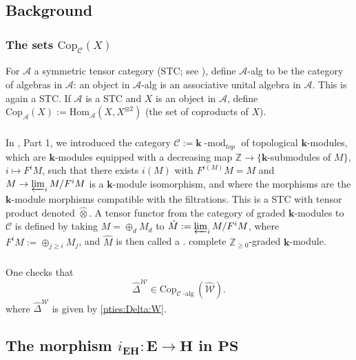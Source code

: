 \documentclass[10pt]{amsart}
\numberwithin{equation}{subsection}
\begin{document}
\subsection{Background}\label{213:toto:BIS:5786}

\subsubsection{The sets $\mathrm{Cop}_{\mathcal C}(X)$}

For $\mathcal A$ a symmetric tensor category (STC; see \cite{McL}), define $\mathcal A$-alg to be the 
category of algebras in $\mathcal A$: an object in $\mathcal A$-alg is an
associative unital algebra in $\mathcal A$. This is again a STC. 
If $\mathcal A$ is a STC and $X$ is an object in $\mathcal A$, define $\mathrm{Cop}_{\mathcal A}(X):=
\mathrm{Hom}_{\mathcal A}(X,X^{\otimes2})$
(the set of coproducts of $X$).

\subsubsection{}%

In \cite{EF1}, Part 1, we introduced the category $\mathcal C:=\mathbf k\operatorname{-mod}_{top}$ of topological $\mathbf k$-modules, which are 
$\mathbf k$-modules equipped with a decreasing map $\mathbb Z\to\{\mathbf k$-submodules of $M\}$, $i\mapsto F^iM$, such that 
there exists $i(M)$ with $F^{i(M)}M=M$ and $M\to \varprojlim_i M/F^iM$ is a $\mathbf k$-module isomorphism, and where 
the morphisms are the $\mathbf k$-module morphisms compatible with the filtrations. This is a STC with tensor product 
denoted $\hat\otimes$. A tensor functor from the category of graded  $\mathbf k$-modules to $\mathcal C$ is defined by taking 
$M=\oplus_d M_d$ to $\hat M:=\varprojlim_i M/F^iM$, where $F^iM:=\oplus_{j\geq i}M_j$, and $\hat M$ is then called a . 
complete $\mathbb Z_{\geq0}$-graded $\mathbf k$-module. 

\subsubsection{}
\label{sect:2:3:titi:BIS}

One checks that  
$$
\hat\Delta^{\mathcal W}\in\mathrm{Cop}_{\mathcal C\operatorname{-alg}}(\hat{\mathcal W}). 
$$
where $\hat\Delta^{\mathcal W}$ is given by \eqref{pties:Delta:W}. 


\subsection{The morphism $i_{\mathbf E\mathbf H} : \mathbf E\to\mathbf H$ in $\mathbf{PS}$}\label{sect:def:iEH}
\end{document}
